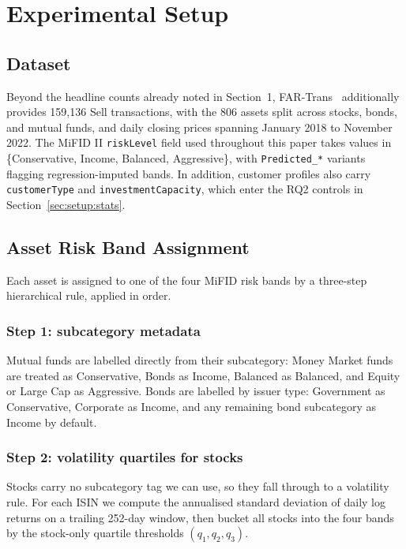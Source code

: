 \section{Experimental Setup}
\label{sec:setup}

\subsection{Dataset}
\label{sec:setup:dataset}

Beyond the headline counts already noted in Section~1, FAR-Trans~\cite{sanzcruzado:fartrans} additionally provides 159{,}136 Sell transactions, with the 806 assets split across stocks, bonds, and mutual funds, and daily closing prices spanning January 2018 to November 2022. The MiFID II \texttt{riskLevel} field used throughout this paper takes values in \{Conservative, Income, Balanced, Aggressive\}, with \texttt{Predicted\_*} variants flagging regression-imputed bands. In addition, customer profiles also carry \texttt{customerType} and \texttt{investmentCapacity}, which enter the RQ2 controls in Section~\ref{sec:setup:stats}.

\subsection{Asset Risk Band Assignment}
\label{sec:setup:bandassignment}

Each asset is assigned to one of the four MiFID risk bands by a three-step hierarchical rule, applied in order.

\subsubsection{Step 1: subcategory metadata} Mutual funds are labelled directly from their subcategory: Money Market funds are treated as Conservative, Bonds as Income, Balanced as Balanced, and Equity or Large Cap as Aggressive. Bonds are labelled by issuer type: Government as Conservative, Corporate as Income, and any remaining bond subcategory as Income by default.

\subsubsection{Step 2: volatility quartiles for stocks} Stocks carry no subcategory tag we can use, so they fall through to a volatility rule. For each ISIN we compute the annualised standard deviation of daily log returns on a trailing 252-day window, then bucket all stocks into the four bands by the stock-only quartile thresholds $(q_1, q_2, q_3)$.

